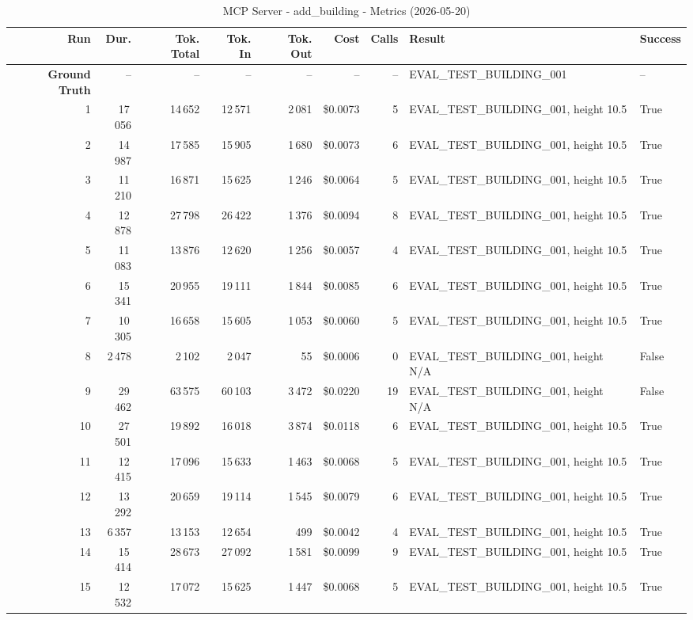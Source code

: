 \documentclass[a4paper,11pt]{article}
\begin{document}
\begin{table}[ht]
\centering
\scriptsize
\caption{MCP Server - add\_building - Metrics (2026-05-20)}
\label{tab:mcp\_add\_building\_metrics\_2026-05-20}
\begin{tabular}{r r r r r r r p{3cm} l}
\hline
Run & Dur. & Tok. Total & Tok. In & Tok. Out & Cost & Calls & Result & Success \\
\hline
\textbf{Ground Truth} & -- & -- & -- & -- & -- & -- & EVAL\_TEST\_BUILDING\_001 & -- \\
\hline
1 & 17\,056 & 14\,652 & 12\,571 & 2\,081 & \$0.0073 & 5 & EVAL\_TEST\_BUILDING\_001, height 10.5 & True \\
2 & 14\,987 & 17\,585 & 15\,905 & 1\,680 & \$0.0073 & 6 & EVAL\_TEST\_BUILDING\_001, height 10.5 & True \\
3 & 11\,210 & 16\,871 & 15\,625 & 1\,246 & \$0.0064 & 5 & EVAL\_TEST\_BUILDING\_001, height 10.5 & True \\
4 & 12\,878 & 27\,798 & 26\,422 & 1\,376 & \$0.0094 & 8 & EVAL\_TEST\_BUILDING\_001, height 10.5 & True \\
5 & 11\,083 & 13\,876 & 12\,620 & 1\,256 & \$0.0057 & 4 & EVAL\_TEST\_BUILDING\_001, height 10.5 & True \\
6 & 15\,341 & 20\,955 & 19\,111 & 1\,844 & \$0.0085 & 6 & EVAL\_TEST\_BUILDING\_001, height 10.5 & True \\
7 & 10\,305 & 16\,658 & 15\,605 & 1\,053 & \$0.0060 & 5 & EVAL\_TEST\_BUILDING\_001, height 10.5 & True \\
8 & 2\,478 & 2\,102 & 2\,047 & 55 & \$0.0006 & 0 & EVAL\_TEST\_BUILDING\_001, height N/A & False \\
9 & 29\,462 & 63\,575 & 60\,103 & 3\,472 & \$0.0220 & 19 & EVAL\_TEST\_BUILDING\_001, height N/A & False \\
10 & 27\,501 & 19\,892 & 16\,018 & 3\,874 & \$0.0118 & 6 & EVAL\_TEST\_BUILDING\_001, height 10.5 & True \\
11 & 12\,415 & 17\,096 & 15\,633 & 1\,463 & \$0.0068 & 5 & EVAL\_TEST\_BUILDING\_001, height 10.5 & True \\
12 & 13\,292 & 20\,659 & 19\,114 & 1\,545 & \$0.0079 & 6 & EVAL\_TEST\_BUILDING\_001, height 10.5 & True \\
13 & 6\,357 & 13\,153 & 12\,654 & 499 & \$0.0042 & 4 & EVAL\_TEST\_BUILDING\_001, height 10.5 & True \\
14 & 15\,414 & 28\,673 & 27\,092 & 1\,581 & \$0.0099 & 9 & EVAL\_TEST\_BUILDING\_001, height 10.5 & True \\
15 & 12\,532 & 17\,072 & 15\,625 & 1\,447 & \$0.0068 & 5 & EVAL\_TEST\_BUILDING\_001, height 10.5 & True \\

\end{tabular}
\end{table}
\end{document}
